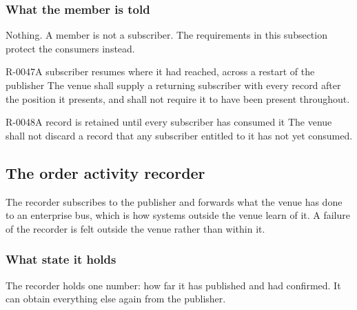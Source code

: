 \subsubsection{What the member is told}
\label{sec:ha:disabled:mep:member}

Nothing. A member is not a subscriber. The requirements in this subsection
protect the consumers instead.

\begin{requirement}{R-0047}{A subscriber resumes where it had reached, across a restart of the publisher}
  The venue shall supply a returning subscriber with every record after the
  position it presents, and shall not require it to have been present
  throughout.
\end{requirement}

\begin{requirement}{R-0048}{A record is retained until every subscriber has consumed it}
  The venue shall not discard a record that any subscriber entitled to it has
  not yet consumed.
\end{requirement}

\subsection{The order activity recorder}
\label{sec:ha:disabled:oar}

The recorder subscribes to the publisher and forwards what the venue has done to
an enterprise bus, which is how systems outside the venue learn of it. A failure
of the recorder is felt outside the venue rather than within it.

\subsubsection{What state it holds}
\label{sec:ha:disabled:oar:state}

The recorder holds one number: how far it has published and had confirmed. It can
obtain everything else again from the publisher.

